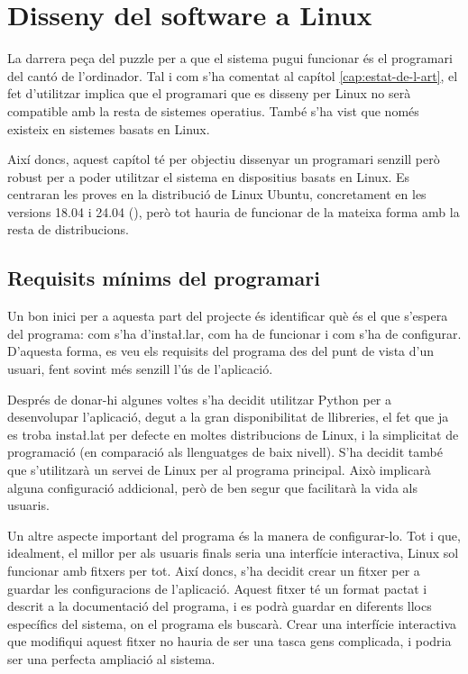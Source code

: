 \chapter{Disseny del software a Linux}

La darrera peça del puzzle per a que el sistema pugui funcionar és el
programari del cantó de l'ordinador. Tal i com s'ha comentat al capítol
\ref{cap:estat-de-l-art}, el fet d'utilitzar  implica que el
programari que es disseny per Linux no serà compatible amb la resta de
sistemes operatius. També s'ha vist que  només existeix en sistemes
basats en Linux.

Així doncs, aquest capítol té per objectiu dissenyar un programari senzill però
robust per a poder utilitzar el sistema en dispositius basats en Linux. Es
centraran les proves en la distribució de Linux Ubuntu, concretament en
les versions 18.04 i 24.04  (), però tot hauria
de funcionar de la mateixa forma amb la resta de distribucions.

\section{Requisits mínims del programari}

Un bon inici per a aquesta part del projecte és identificar què és el que
s'espera del programa: com s'ha d'insta\l.lar, com ha de funcionar i com
s'ha de configurar. D'aquesta forma, es veu els requisits del programa des del
punt de vista d'un usuari, fent sovint més senzill l'ús de l'aplicació.

Després de donar-hi algunes voltes s'ha decidit utilitzar Python per a
desenvolupar l'aplicació, degut a la gran disponibilitat de llibreries, el fet
que ja es troba insta\l.lat per defecte en moltes distribucions de Linux, i
la simplicitat de programació (en comparació als llenguatges de baix nivell).
S'ha decidit també que s'utilitzarà un servei de Linux per al programa principal.
Això implicarà alguna configuració addicional, però de ben segur que facilitarà
la vida als usuaris.

Un altre aspecte important del programa és la manera de configurar-lo. Tot i que,
idealment, el millor per als usuaris finals seria una interfície interactiva,
Linux sol funcionar amb fitxers per tot. Així doncs, s'ha decidit crear un fitxer
 per a guardar les configuracions de l'aplicació. Aquest fitxer té
un format pactat i descrit a la documentació del programa, i es podrà guardar en
diferents llocs específics del sistema, on el programa els buscarà. Crear una
interfície interactiva que modifiqui aquest fitxer no hauria de ser una tasca
gens complicada, i podria ser una perfecta ampliació al sistema.

